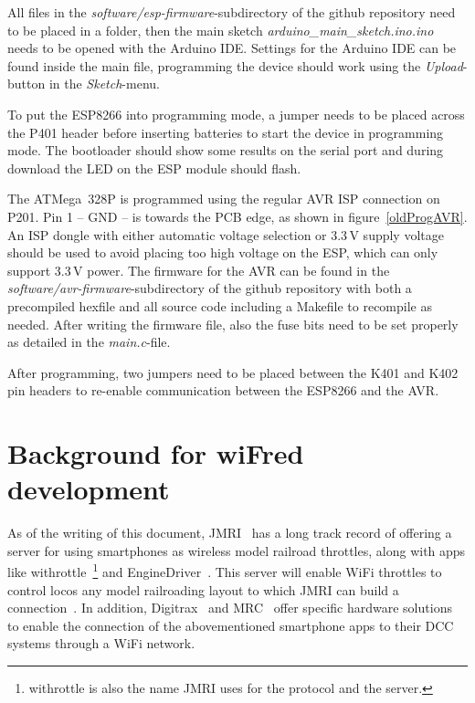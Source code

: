 \documentclass[11pt,a4paper]{scrartcl}
\begin{document}
All files in the \textit{software/esp-firmware}-subdirectory of the github repository need to be placed in a folder, then the main sketch \textit{arduino\_main\_sketch.ino.ino} needs to be opened with the Arduino IDE. Settings for the Arduino IDE can be found inside the main file, programming the device should work using the \textit{Upload}-button in the \textit{Sketch}-menu.

To put the ESP8266 into programming mode, a jumper needs to be placed across the P401 header before inserting batteries to start the device in programming mode. The bootloader should show some results on the serial port and during download the LED on the ESP module should flash.

The ATMega~328P is programmed using the regular AVR ISP connection on P201. Pin 1 -- GND -- is towards the PCB edge, as shown in figure~\ref{oldProgAVR}. An ISP dongle with either automatic voltage selection or 3.3\,V supply voltage should be used to avoid placing too high voltage on the ESP, which can only support 3.3\,V power. The firmware for the AVR can be found in the \textit{software/avr-firmware}-subdirectory of the github repository with both a precompiled hexfile and all source code including a Makefile to recompile as needed. After writing the firmware file, also the fuse bits need to be set properly as detailed in the \textit{main.c}-file.

After programming, two jumpers need to be placed between the K401 and K402 pin headers to re-enable communication between the ESP8266 and the AVR.

\clearpage

\section{Background for wiFred development} \label{background}

As of the writing of this document, JMRI~\cite{jmri} has a long track record of offering a server for using smartphones as wireless model railroad throttles, along with apps like withrottle~\cite{withrottleApp}\footnote{withrottle is also the name JMRI uses for the protocol and the server.} and EngineDriver~\cite{EngineDriver}. This server will enable WiFi throttles to control locos any model railroading layout to which JMRI can build a connection~\cite{jmrihardwaresupport}. In addition, Digitrax~\cite{digitrax} and MRC~\cite{mrc} offer specific hardware solutions to enable the connection of the abovementioned smartphone apps to their DCC systems through a WiFi network.
\end{document}
